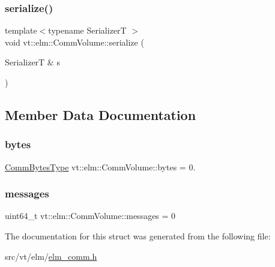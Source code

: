 \subsubsection{\texorpdfstring{serialize()}{serialize()}}
{\footnotesize\ttfamily template$<$typename SerializerT $>$ \\
void vt\+::elm\+::\+Comm\+Volume\+::serialize (\begin{DoxyParamCaption}\item[{SerializerT \&}]{s }\end{DoxyParamCaption})\hspace{0.3cm}{\ttfamily [inline]}}



\subsection{Member Data Documentation}
\mbox{\label{structvt_1_1elm_1_1_comm_volume_a3dc5194d74ff2c45e8cc941e3bff4a35}} 
\subsubsection{\texorpdfstring{bytes}{bytes}}
{\footnotesize\ttfamily \hyperlink{namespacevt_1_1elm_a6005d029f0531d2809076ce7186416bf}{Comm\+Bytes\+Type} vt\+::elm\+::\+Comm\+Volume\+::bytes = 0.}

\mbox{\label{structvt_1_1elm_1_1_comm_volume_a401827dc013273393db0ef10f6bfedd0}} 
\subsubsection{\texorpdfstring{messages}{messages}}
{\footnotesize\ttfamily uint64\+\_\+t vt\+::elm\+::\+Comm\+Volume\+::messages = 0}



The documentation for this struct was generated from the following file\+:\begin{DoxyCompactItemize}
\item 
src/vt/elm/\hyperlink{elm__comm_8h}{elm\+\_\+comm.\+h}\end{DoxyCompactItemize}
